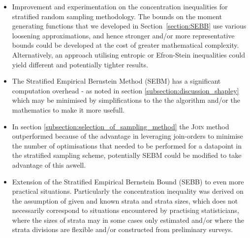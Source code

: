 \begin{itemize}
\item	Improvement and experimentation on the concentration inequalities for stratified random sampling methodology. The bounds on the moment generating functions that we developed in Section~\ref{section:SEBB} use various loosening approximations, and hence stronger and/or more representative bounds could be developed at the cost of greater mathematical complexity.
Alternatively, an approach utilising entropic \citep{Boucheron_concentrationinequalities} or Efron-Stein inequalities \citep{efron1981} could yield different and potentially tighter results.
\item	The Stratified Empirical Bernstein Method (SEBM) has a significant computation overhead - as noted in section \ref{subsection:discussion_shapley} which may be minimised by simplifications to the the algorithm and/or the mathematics to make it more usefull.
\item	In section \ref{subsection:selection_of_sampling_method} the \textsc{Join} method outperformed because of the advantage in leveraging join-orders to minimise the number of optimisations that needed to be performed for a datapoint in the stratified sampling scheme, potentially SEBM could be modified to take advantage of this aswell.
\item	Extension of the Stratified Empirical Bernstein Bound (SEBB) to even more practical situations. Particularly the concentration inequality was derived on the assumption of given and known strata and strata sizes, which does not necessarily correspond to situations encountered by practising statisticians, where the sizes of strata may in some cases only estimated and/or where the strata divisions are flexible and/or constructed from preliminary surveys.
\end{itemize}



